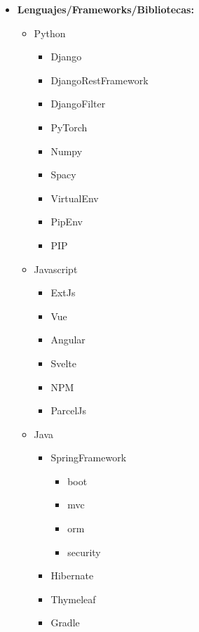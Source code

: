 \begin{multicols}{3}
\begin{itemize}
\setlength\itemsep{0pt}
\item
    \textbf{Lenguajes/Frameworks/Bibliotecas:}
    \begin{itemize}
        \item Python
            \begin{itemize}
                \item Django
                \item DjangoRestFramework
                \item DjangoFilter
                \item PyTorch
                \item Numpy
                \item Spacy
                \item VirtualEnv
                \item PipEnv
                \item PIP
            \end{itemize}
        \item Javascript
            \begin{itemize}
                \item ExtJs
                \item Vue
                \item Angular
                \item Svelte
                \item NPM
                \item ParcelJs
            \end{itemize}
        \item Java
            \begin{itemize}
                \item SpringFramework
                    \begin{itemize}
                        \item boot
                        \item mvc
                        \item orm
                        \item security
                    \end{itemize}
                \item Hibernate
                \item Thymeleaf
                \item Gradle

\end{itemize}
\end{itemize}
\end{itemize}
\end{multicols}

